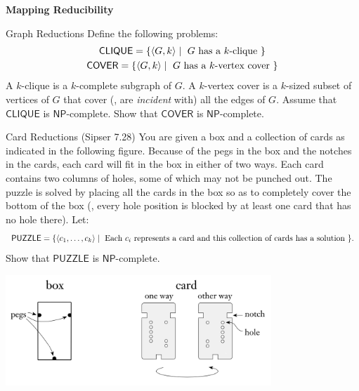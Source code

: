 \documentclass[11pt]{book}
\newcommand{\doctitle}{Mapping Reducibility}
\begin{document}
\begin{center}
  \large\textbf{{\doctitle}}
\end{center}

\vspace{2em}


\newcommand{\desc}[1]{\ensuremath{\langle #1 \rangle}}
\newcommand{\NP}{\ensuremath{\mathsf{NP}}\xspace}
\newcommand{\prob}[1]{\ensuremath{\mathsf{#1}}\xspace}


\begin{problem}{Graph Reductions}
  Define the following problems:
  \begin{gather*}
    \prob{CLIQUE} = \{ \desc{G, k} \mid \text{ \( G \) has a \( k \)-clique } \} \\
    \prob{COVER}  = \{ \desc{G, k} \mid \text{ \( G \) has a \( k \)-vertex cover } \}
  \end{gather*}
  A \( k \)-clique is a \( k \)-complete subgraph of \( G \).
  A \( k \)-vertex cover is a \( k \)-sized subset of vertices of \( G \) that
  cover (\ie, are \emph{incident} with) all the edges of \( G \).
  Assume that \prob{CLIQUE} is \NP-complete.
  Show that \prob{COVER} is \NP-complete.
\end{problem}

\newpage

\begin{problem}{Card Reductions}
  (Sipser 7.28)
  You are given a box and a collection of cards as indicated in the following figure.
  Because of the pegs in the box and the notches in the cards, each card will fit in the box in either of two ways.
  Each card contains two columns of holes, some of which may not be punched out.
  The puzzle is solved by placing all the cards in the box so as to completely cover the bottom of the box (\ie, every hole position is blocked by at least one card that has no hole there).
  Let:
  \[
    \prob{PUZZLE} = \{ \desc{c_1, \ldots, c_k} \mid \text{ Each \( c_i \) represents a card and this collection of cards has a solution } \}.
  \]
  Show that \prob{PUZZLE} is \NP-complete.

  \begin{center}
    \includegraphics[width=0.75\textwidth]{cards}
  \end{center}
\end{problem}
\end{document}
